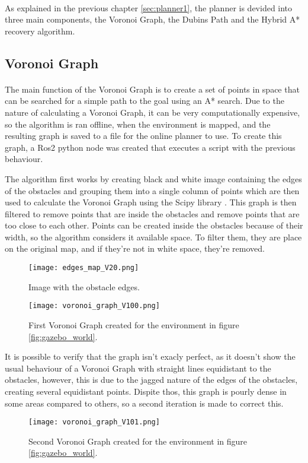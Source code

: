 \paragraph{}As explained in the previous chapter \ref{sec:planner1}, 
the planner is devided into three main components, the Voronoi Graph, the Dubins Path and the Hybrid A* recovery algorithm.

\subsection{Voronoi Graph}
\label{subsec:voronoi_graph}

\paragraph{}The main function of the Voronoi Graph is to create a set of points in space that can be searched for a  
simple path to the goal using an A* search. Due to the nature of calculating a Voronoi Graph, it can be very computationally 
expensive, so the algorithm is ran offline, when the environment is mapped, and the resulting graph is saved to a 
file for the online planner to use. To create this graph, a Ros2 python node was created that executes a script with 
the previous behaviour.

The algorithm first works by creating black and white image containing the edges of the obstacles and grouping them 
into a single column of points which are then used to calculate the Voronoi Graph using the 
Scipy library \cite{Scipy}. 
This graph is then filtered to remove points that are inside the obstacles and remove points that are too close to each other. Points can be created inside the obstacles 
because of their width, so the algorithm considers it available space. To filter them, they are 
place on the original map, and  if they're not in white space, they're removed.
\begin{figure}[h]
    \centering
    \texttt{[image: edges\_map\_V20.png]}
    \caption{Image with the obstacle edges.}
    \label{fig:voronoi_edges}
\end{figure}
\begin{figure}[h]
    \centering
    \texttt{[image: voronoi\_graph\_V100.png]}
    \caption{First Voronoi Graph created for the environment in figure \ref{fig:gazebo_world}.}
    \label{fig:voronoi_graph1}
\end{figure}

It is possible to verify that the graph isn't exacly perfect, as it doesn't 
show the usual behaviour of a Voronoi Graph with straight lines equidistant to the 
obstacles, however, this is due to the jagged nature of the edges of the obstacles, creating 
several equidistant points. Dispite thos, this graph is pourly dense in some 
areas compared to others, so a second iteration is made to correct this.
\begin{figure}[h]
    \centering
    \texttt{[image: voronoi\_graph\_V101.png]}
    \caption{Second Voronoi Graph created for the environment in figure \ref{fig:gazebo_world}.}
    \label{fig:voronoi_graph2}
\end{figure}

